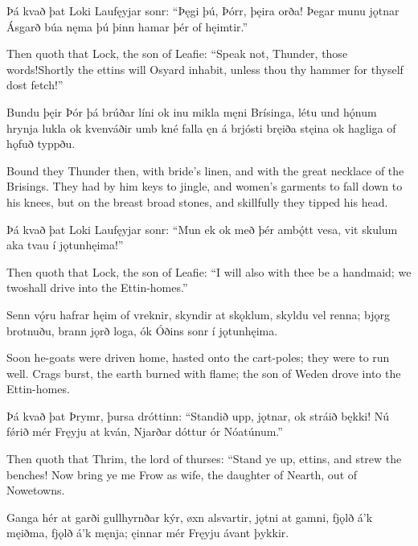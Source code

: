 Þá kvað þat Loki \hld Laufęyjar sonr:
“Þęgi þú, Þórr, \hld þęira orða!
Þegar munu jǫtnar \hld Ásgarð búa
nęma þú þinn hamar \hld þér of hęimtir.”

Then quoth that Lock, the son of Leafie: “Speak not, Thunder, those words!\footnotemark[1] Shortly the ettins will Osyard inhabit, unless thou thy hammer for thyself dost fetch!”

Bundu þęir Þór þá \hld brúðar líni
ok inu mikla \hld męni Brísinga,
létu und hǫ́num \hld hrynja lukla
ok kvenváðir \hld umb kné falla
ęn á brjósti \hld bręiða stęina
ok hagliga \hld of hǫfuð typpðu.

Bound they Thunder then, with bride’s linen, and with the great necklace of the Brisings. They had by him keys to jingle, and women's garments to fall down to his knees, but on the breast broad stones, and skillfully they tipped his head.

Þá kvað þat Loki \hld Laufęyjar sonr:
“Mun ek ok með þér \hld ambǫ́tt vesa,
vit skulum aka tvau \hld í jǫtunhęima!”

Then quoth that Lock, the son of Leafie: “I will also with thee be a handmaid; we two\footnotemark[1] shall drive into the Ettin-homes.”

Senn vǫ́ru hafrar \hld hęim of vreknir,
skyndir at skǫklum, \hld skyldu vel renna;
bjǫrg brotnuðu, \hld brann jǫrð loga,
ók Óðins sonr \hld í jǫtunhęima.

Soon he-goats were driven home, hasted onto the cart-poles; they were to run well. Crags burst, the earth burned with flame; the son of Weden drove into the Ettin-homes.\footnotemark[1]

Þá kvað þat Þrymr, \hld þursa dróttinn:
“Standið upp, jǫtnar, \hld ok stráið bękki!
Nú fǿrið mér \hld Fręyju at kván,
Njarðar dóttur \hld ór Nóatúnum.”

Then quoth that Thrim, the lord of thurses: “Stand ye up, ettins, and strew the benches! Now bring ye me Frow as wife, the daughter of Nearth, out of Nowetowns.

Ganga hér at garði \hld gullhyrnðar kýr,
øxn alsvartir, \hld jǫtni at gamni,
fjǫlð á’k męiðma, \hld fjǫlð á’k męnja;
ęinnar mér Fręyju \hld ávant þykkir.

